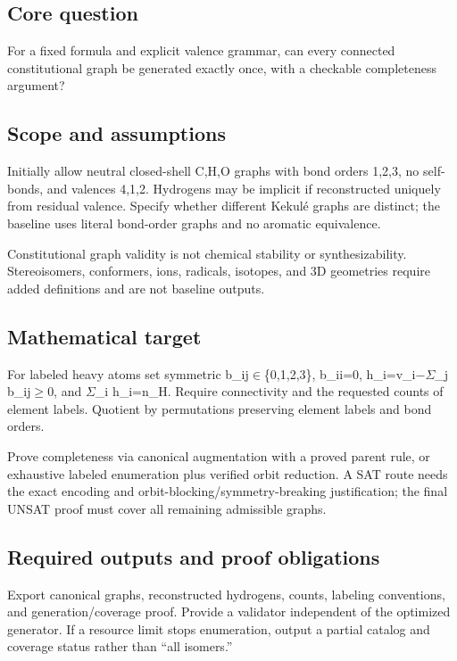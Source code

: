 \documentclass[
  11pt,
]{article}
\begin{document}
\subsection{Core question}

For a fixed formula and explicit valence grammar, can every connected
constitutional graph be generated exactly once, with a checkable
completeness argument?

\subsection{Scope and assumptions}

Initially allow neutral closed-shell C,H,O graphs with bond orders
1,2,3, no self-bonds, and valences 4,1,2. Hydrogens may be implicit if
reconstructed uniquely from residual valence. Specify whether different
Kekulé graphs are distinct; the baseline uses literal bond-order graphs
and no aromatic equivalence.

Constitutional graph validity is not chemical stability or
synthesizability. Stereoisomers, conformers, ions, radicals, isotopes,
and 3D geometries require added definitions and are not baseline
outputs.

\subsection{Mathematical target}

For labeled heavy atoms set symmetric b\_ij\ensuremath{\in}\{0,1,2,3\},
b\_ii=0, h\_i=v\_i\ensuremath{-}\ensuremath{\Sigma}\_j
b\_ij\ensuremath{\ge}0, and \ensuremath{\Sigma}\_i h\_i=n\_H. Require
connectivity and the requested counts of element labels. Quotient by
permutations preserving element labels and bond orders.

Prove completeness via canonical augmentation with a proved parent rule,
or exhaustive labeled enumeration plus verified orbit reduction. A SAT
route needs the exact encoding and orbit-blocking/symmetry-breaking
justification; the final UNSAT proof must cover all remaining admissible
graphs.

\subsection{Required outputs and proof obligations}

Export canonical graphs, reconstructed hydrogens, counts, labeling
conventions, and generation/coverage proof. Provide a validator
independent of the optimized generator. If a resource limit stops
enumeration, output a partial catalog and coverage status rather than
``all isomers.''
\end{document}
